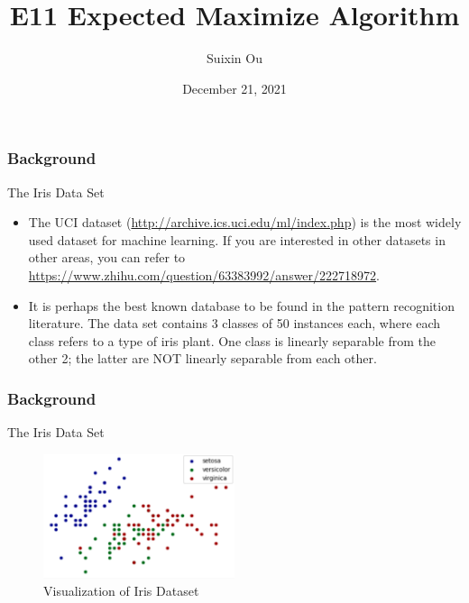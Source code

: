 \documentclass{beamer}
\title{E11 Expected Maximize Algorithm}
\author{Suixin Ou} %
\institute[SYSU] %
{
  School of Computer Science\\
  Sun Yat-sen University \\ %
  \medskip
}
\date{December 21, 2021} %
\begin{document}
\begin{frame}
  \titlepage
\end{frame}

\begin{frame}
  \frametitle{Background}
  \begin{block}{The Iris Data Set}
    \begin{itemize}
    \item 
The UCI dataset (\url{http://archive.ics.uci.edu/ml/index.php}) is the most widely used dataset for machine learning. If you are interested in other datasets in other areas, you can refer to \url{https://www.zhihu.com/question/63383992/answer/222718972}.

    \item It is perhaps the best known database to be found in the pattern recognition literature. The data set contains 3 classes of 50 instances each, where each class refers to a type of iris plant. One class is linearly separable from the other 2; the latter are NOT linearly separable from each other.

    \end{itemize}
      
  \end{block}
\end{frame}

\begin{frame}
  \frametitle{Background}
  \begin{block}{The Iris Data Set}
    \begin{figure}[ht]
      \centering
      \includegraphics[width=0.5\textwidth]{Pic/visualization}
      \caption{Visualization of Iris Dataset}
    \end{figure}
  \end{block}
\end{frame}
\end{document}
